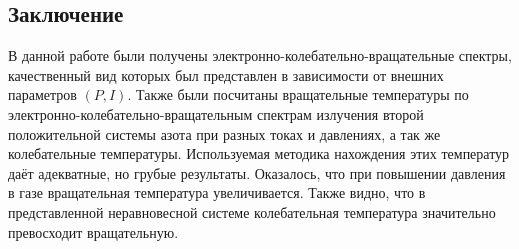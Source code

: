 \subsection{Заключение}
В данной работе были получены электронно-колебательно-вращательные спектры, качественный вид которых был представлен в зависимости от внешних параметров $(P,I)$. Также были посчитаны вращательные температуры по электронно-колебательно-вращательным спектрам излучения второй положительной системы азота при разных токах и
давлениях, а так же колебательные температуры. Используемая методика нахождения этих температур даёт адекватные, но грубые результаты. Оказалось, что при повышении
давления в газе вращательная температура увеличивается. Также видно, что в представленной неравновесной системе колебательная температура значительно превосходит вращательную.